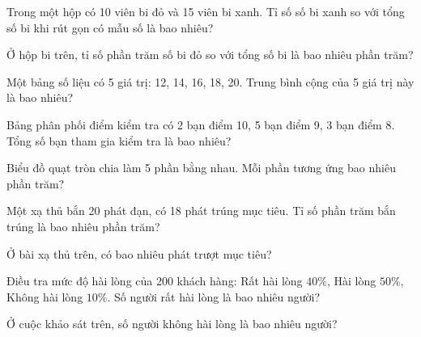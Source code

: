\begin{ex}
  Trong một hộp có 10 viên bi đỏ và 15 viên bi xanh. Tỉ số số bi xanh so với tổng số bi khi rút gọn có mẫu số là bao nhiêu?
\end{ex}

\begin{ex}
  Ở hộp bi trên, tỉ số phần trăm số bi đỏ so với tổng số bi là bao nhiêu phần trăm?
\end{ex}

\begin{ex}
  Một bảng số liệu có 5 giá trị: 12, 14, 16, 18, 20. Trung bình cộng của 5 giá trị này là bao nhiêu?
\end{ex}

\begin{ex}
  Bảng phân phối điểm kiểm tra có 2 bạn điểm 10, 5 bạn điểm 9, 3 bạn điểm 8. Tổng số bạn tham gia kiểm tra là bao nhiêu?
\end{ex}

\begin{ex}
  Biểu đồ quạt tròn chia làm 5 phần bằng nhau. Mỗi phần tương ứng bao nhiêu phần trăm?
\end{ex}

\begin{ex}
  Một xạ thủ bắn 20 phát đạn, có 18 phát trúng mục tiêu. Tỉ số phần trăm bắn trúng là bao nhiêu phần trăm?
\end{ex}

\begin{ex}
  Ở bài xạ thủ trên, có bao nhiêu phát trượt mục tiêu?
\end{ex}

\begin{ex}
  Điều tra mức độ hài lòng của 200 khách hàng: Rất hài lòng $40\%$, Hài lòng $50\%$, Không hài lòng $10\%$. Số người rất hài lòng là bao nhiêu người?
\end{ex}

\begin{ex}
  Ở cuộc khảo sát trên, số người không hài lòng là bao nhiêu người?
\end{ex}

